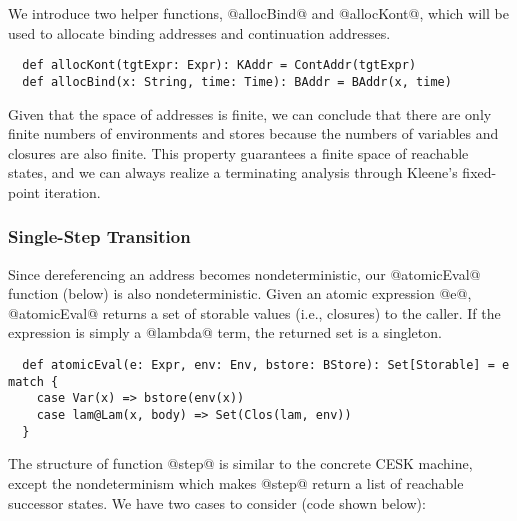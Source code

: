 \documentclass[acmsmall, review]{acmart}\settopmatter{}
\begin{document}
We introduce two helper functions, @allocBind@ and @allocKont@, which will be
used to allocate binding addresses and continuation addresses.

\begin{lstlisting}
  def allocKont(tgtExpr: Expr): KAddr = ContAddr(tgtExpr)
  def allocBind(x: String, time: Time): BAddr = BAddr(x, time)
\end{lstlisting}

Given that the space of addresses is finite, we can conclude that there are only finite numbers
of environments and stores because the numbers of variables and closures are also finite.
This property guarantees a finite space of reachable states, and we can always realize a
terminating analysis through Kleene's fixed-point iteration.

\subsubsection{Single-Step Transition}

Since dereferencing an address becomes nondeterministic, our @atomicEval@
function (below) is also nondeterministic. Given an atomic expression @e@,
@atomicEval@ returns a set of storable values (i.e., closures) to the caller.
If the expression is simply a @lambda@ term, the returned set is a singleton.

\begin{lstlisting}
  def atomicEval(e: Expr, env: Env, bstore: BStore): Set[Storable] = e match {
    case Var(x) => bstore(env(x))
    case lam@Lam(x, body) => Set(Clos(lam, env))
  }
\end{lstlisting}

The structure of function @step@ is similar to the concrete CESK machine,
except the nondeterminism which makes @step@ return a list of reachable successor states.
We have two cases to consider (code shown below):
\end{document}
